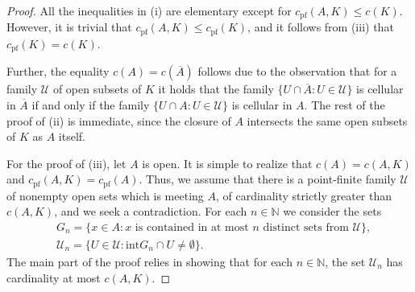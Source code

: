 \documentclass{amsart}
\numberwithin{equation}{section}
\theoremstyle{definition}
\def\en{\mathbb N}
\begin{document}
\begin{proof}
All the inequalities in (i) are elementary except for $c_{\text{pf}}(A, K) \leq c(K)$. However, it is trivial that $c_{\text{pf}}(A, K) \leq c_{\text{pf}}(K)$, and it follows from (iii) that $c_{\text{pf}}(K)=c(K)$.

Further, the equality $c(A)=c(\overline{A})$ follows due to the observation that for a family $\mathcal{U}$ of open subsets of $K$ it holds that the family $\{U \cap \overline{A}: U \in \mathcal{U}\}$ is cellular in $\overline{A}$ if and only if the family $\{U \cap A: U \in \mathcal{U}\}$ is cellular in $A$. 
The rest of the proof of (ii) is immediate, since the closure of $A$ intersects the same open subsets of $K$ as $A$ itself.

For the proof of (iii), let $A$ is open. It is simple to realize that $c(A)=c(A, K)$ and $c_{\text{pf}}(A, K)=c_{\text{pf}}(A)$. Thus, we assume that there is a point-finite family $\mathcal{U}$ of nonempty open sets which is meeting $A$, of cardinality strictly greater than $c(A, K)$, and we seek a contradiction. For each $n \in \en$ we consider the sets 
\begin{equation}
\nonumber
\begin{aligned}
&G_n=\{x \in A: x \text{ is contained in at most } n \text{ distinct sets from } \mathcal{U}\}, \\&
\mathcal{U}_n=\{U \in \mathcal{U}:\text{int} G_n \cap U\neq \emptyset\}.
\end{aligned}
\end{equation}
The main part of the proof relies in showing that for each $n \in \en$, the set $\mathcal{U}_n$ has cardinality at most $c(A, K)$. 


\end{proof}
\end{document}
